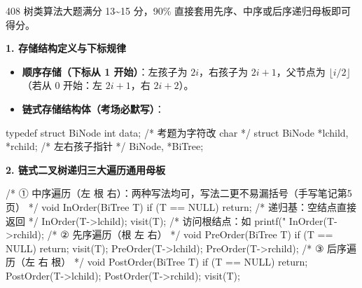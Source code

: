 \documentclass[10pt,a4paper]{ctexart}
\begin{document}

408 树类算法大题满分 13\textasciitilde{}15 分，90\% 直接套用先序、中序或后序递归母板即可得分。

\par\addvspace{2pt}\noindent\textbf{1. 存储结构定义与下标规律}\par

\begin{itemize}

\item \textbf{顺序存储（下标从 1 开始）}：左孩子为 $2i$，右孩子为 $2i+1$，父节点为 $\lfloor i/2 \rfloor$（若从 0 开始：左 $2i+1$，右 $2i+2$）。

\item \textbf{链式存储结构体（考场必默写）}：

\end{itemize}

\begin{codebox}
typedef struct BiNode {
    int data;                            /* 考题为字符改 char */
    struct BiNode *lchild, *rchild;      /* 左右孩子指针 */
} BiNode, *BiTree;
\end{codebox}

\par\addvspace{2pt}\noindent\textbf{2. 链式二叉树递归三大遍历通用母板}\par

\begin{codebox}
/* ① 中序遍历（左 根 右）：两种写法均可，写法二更不易漏括号（手写笔记第5页） */
void InOrder(BiTree T) {
    if (T == NULL) return;              /* 递归基：空结点直接返回 */
    InOrder(T->lchild);
    visit(T);                           /* 访问根结点：如 printf("%
    InOrder(T->rchild);
}
/* ② 先序遍历（根 左 右） */
void PreOrder(BiTree T) {
    if (T == NULL) return;
    visit(T); PreOrder(T->lchild); PreOrder(T->rchild);
}
/* ③ 后序遍历（左 右 根） */
void PostOrder(BiTree T) {
    if (T == NULL) return;
    PostOrder(T->lchild); PostOrder(T->rchild); visit(T);
}
\end{codebox}

\par\addvspace{3pt}\par\addvspace{3pt}

\end{document}
